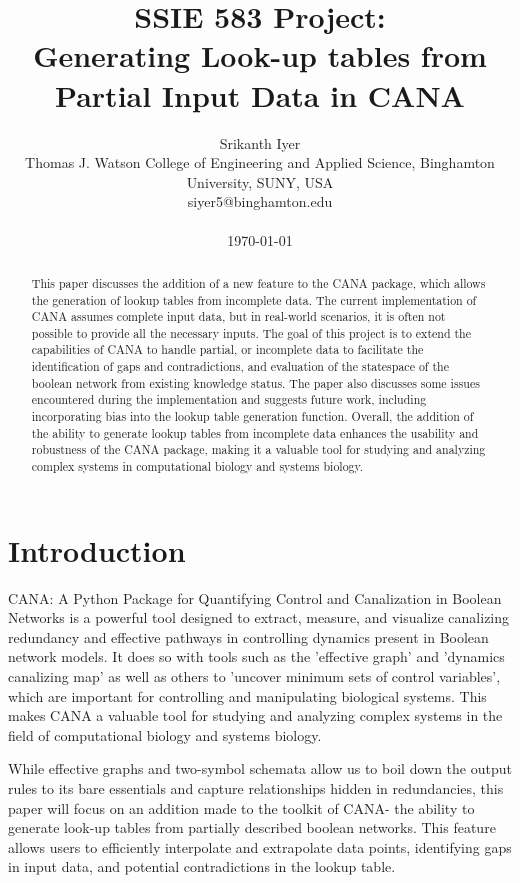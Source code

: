 \documentclass[letterpaper]{article}
\title{SSIE 583 Project: \\Generating Look-up tables from Partial Input Data in CANA\\}
\author{
    Srikanth Iyer%
    \\
    Thomas J. Watson College of Engineering and Applied Science, Binghamton University, SUNY, USA \\
    siyer5@binghamton.edu\\\\
    \today
} %
\begin{document}
\maketitle

\begin{abstract}
    This paper discusses the addition of a new feature to the CANA package, which allows the generation of lookup tables from incomplete data. The current implementation of CANA assumes complete input data, but in real-world scenarios, it is often not possible to provide all the necessary inputs. The goal of this project is to extend the capabilities of CANA to handle partial, or incomplete data to facilitate the identification of gaps and contradictions, and evaluation of the statespace of the boolean network from existing knowledge status. The paper also discusses some issues encountered during the implementation and suggests future work, including incorporating bias into the lookup table generation function. Overall, the addition of the ability to generate lookup tables from incomplete data enhances the usability and robustness of the CANA package, making it a valuable tool for studying and analyzing complex systems in computational biology and systems biology.
\end{abstract}




\section{Introduction}

CANA: A Python Package for Quantifying Control and Canalization in Boolean Networks \citep{CANA} is a powerful tool designed to extract, measure, and visualize canalizing redundancy and effective pathways in controlling dynamics present in Boolean network models.
It does so with tools such as the 'effective graph' and 'dynamics canalizing map' as well as others to 'uncover minimum sets of control variables', which are important for controlling and manipulating biological systems. 
This makes CANA a valuable tool for studying and analyzing complex systems in the field of computational biology and systems biology. 

While effective graphs and two-symbol schemata allow us to boil down the output rules to its bare essentials and capture relationships hidden in redundancies, this paper will focus on an addition made to the toolkit of CANA- the ability to generate look-up tables from partially described boolean networks. 
This feature allows users to efficiently interpolate and extrapolate data points, identifying gaps in input data, and potential contradictions in the lookup table. 
\end{document}

